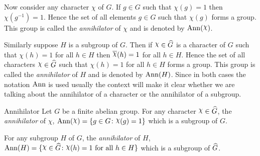 Now consider any character $\chi$ of $G$. If $g\in G$ such that $\chi(g)=1$ then $\chi(g^{-1})=1$. Hence the set of all elements $g\in G$ such that $\chi(g)$ forms a group. This group is called the \emph{annihilator} of $\chi$ and is denoted by $\Ann(\chi)$.

Similarly suppose $H$ is a subgroup of $G$. Then if $\chi\in\hG$ is a character of $G$ such that $\chi(h)=1$ for all $h\in H$ then $\ov{\chi}(h)=1$ for all $h\in H$. Hence the set of all characters $\chi\in \hG$ such that $\chi(h)=1$ for all $h\in H$ forms a group. This group is called the \emph{annihilator} of $H$ and is denoted by $\operatorname{Ann}(H)$. Since in both cases the notation $\operatorname{Ann}$ is used usually the context will make it clear whether we are talking about the annihilator of a character or the annihilator of a subgroup.

\begin{Definition}{Annihilator}{}
  Let $G$ be a finite abelian group. For any character $\chi\in \hG$, the \emph{annihilator} of $\chi$, $\Ann(\chi)=\{g\in G\colon \chi(g)=1\}$ which is a subgroup of $G$. \setlength{\parindent}{15pt}

  For any subgroup $H$ of $G$, the \emph{annihilator} of $H$, $\Ann(H)=\{\chi\in \hG\colon \chi(h)=1 \text{ for all } h\in H\}$ which is a subgroup of $\widehat{G}$.
\end{Definition}


